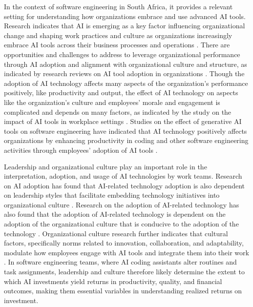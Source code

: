\documentclass[11pt]{report}
\begin{document}
In the context of software engineering in South Africa, it provides a relevant setting for understanding how organizations embrace and use advanced AI tools. Research indicates that AI is emerging as a key factor influencing organizational change and shaping work practices and culture as organizations increasingly embrace AI tools across their business processes and operations \autocite{Murire2024}. There are opportunities and challenges to address to leverage organizational performance through AI adoption and alignment with organizational culture and structure, as indicated by research reviews on AI tool adoption in organizations \autocite{Romeo2025}. Though the adoption of AI technology affects many aspects of the organization's performance positively, like productivity and output, the effect of AI technology on aspects like the organization's culture and employees' morale and engagement is complicated and depends on many factors, as indicated by the study on the impact of AI tools in workplace settings \autocite{Kassa2025}. Studies on the effect of generative AI tools on software engineering have indicated that AI technology positively affects organizations by enhancing productivity in coding and other software engineering activities through employees' adoption of AI tools \autocite{Alenezi2025}.

Leadership and organizational culture play an important role in the interpretation, adoption, and usage of AI technologies by work teams. Research on AI adoption has found that AI-related technology adoption is also dependent on leadership styles that facilitate embedding technology initiatives into organizational culture \autocite{Romeo2025}. Research on the adoption of AI-related technology has also found that the adoption of AI-related technology is dependent on the adoption of the organizational culture that is conducive to the adoption of the technology \autocite{Kassa2025}. Organizational culture research further indicates that cultural factors, specifically norms related to innovation, collaboration, and adaptability, modulate how employees engage with AI tools and integrate them into their work \autocite{Murire2024}. In software engineering teams, where AI coding assistants alter routines and task assignments, leadership and culture therefore likely determine the extent to which AI investments yield returns in productivity, quality, and financial outcomes, making them essential variables in understanding realized returns on investment.

\end{document}
